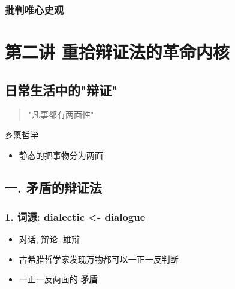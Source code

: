 \documentclass[11pt]{article}
\begin{document}
\subsubsection{批判唯心史观}
\label{sec:org8fba177}
\section{第二讲 重拾辩证法的革命内核}
\label{sec:org9714e38}
\subsection{日常生活中的"辩证"}
\label{sec:org9843cea}
\begin{quote}
"凡事都有两面性"
\end{quote}
乡愿哲学
\begin{itemize}
\item 静态的把事物分为两面
\end{itemize}
\subsection{一. 矛盾的辩证法}
\label{sec:org26a8666}
\subsubsection{1. 词源: dialectic <- dialogue}
\label{sec:org3fc945b}
\begin{itemize}
\item 对话, 辩论, 雄辩
\item 古希腊哲学家发现万物都可以一正一反判断
\item 一正一反两面的 \textbf{矛盾}
\end{itemize}
\end{document}
